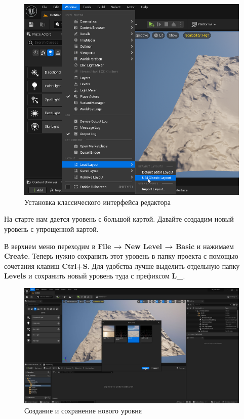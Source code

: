 \begin{figure}[h]
    \centering
    \includegraphics[width=\textwidth]{Lections/Layout.png}
    \caption{Установка классического интерфейса редактора}
\end{figure}

На старте нам дается уровень с большой картой. Давайте создадим новый уровень с упрощенной картой.

В верхнем меню переходим в \textbf{File → New Level → Basic} и нажимаем \textbf{Create}. Теперь нужно сохранить этот уровень в папку проекта с помощью сочетания клавиш \textbf{Ctrl+S}. Для удобства лучше выделить отдельную папку \textbf{Levels} и сохранить новый уровень туда с префиксом \textbf{L\_}.

\begin{figure}[h]
    \centering
    \includegraphics[width=\textwidth]{Lections/LevelChange.jpg}
    \caption{Создание и сохранение нового уровня}
\end{figure}

